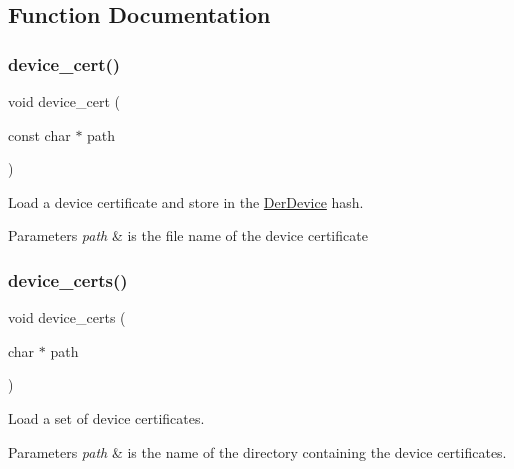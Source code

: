 \subsection{Function Documentation}
\mbox{\label{group__der_gafd7d2723cd9a24b23c7d06fda373a91e}} 
\subsubsection{\texorpdfstring{device\+\_\+cert()}{device\_cert()}}
{\footnotesize\ttfamily void device\+\_\+cert (\begin{DoxyParamCaption}\item[{const char $\ast$}]{path }\end{DoxyParamCaption})}



Load a device certificate and store in the \hyperlink{structDerDevice}{Der\+Device} hash. 


\begin{DoxyParams}{Parameters}
{\em path} & is the file name of the device certificate \\
\hline
\end{DoxyParams}
\mbox{\label{group__der_ga857218ef8ee25342bf29186a52db116b}} 
\subsubsection{\texorpdfstring{device\+\_\+certs()}{device\_certs()}}
{\footnotesize\ttfamily void device\+\_\+certs (\begin{DoxyParamCaption}\item[{char $\ast$}]{path }\end{DoxyParamCaption})}



Load a set of device certificates. 


\begin{DoxyParams}{Parameters}
{\em path} & is the name of the directory containing the device certificates. \\
\hline
\end{DoxyParams}
\mbox{\label{group__der_ga40451d206ceaf9e1c8531f7d751056d7}} 
